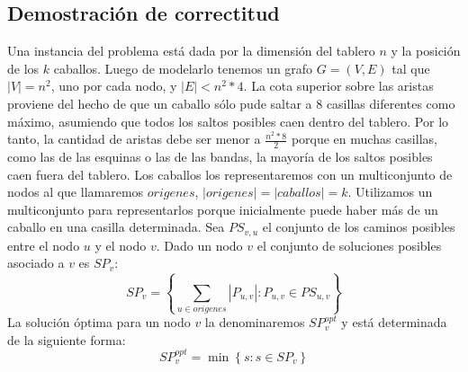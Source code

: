 \subsection{Demostración de correctitud}
Una instancia del problema está dada por la dimensión del tablero $n$ y la posición
de los $k$ caballos. Luego de modelarlo tenemos un grafo $G = (V, E)$ tal que $\left\vert{V}\right\vert = n^2$, uno
por cada nodo, y $\left\vert{E}\right\vert < n^2 * 4$. La cota superior sobre las aristas proviene del hecho de que
un caballo sólo pude saltar a 8 casillas diferentes como máximo, asumiendo que todos los
saltos posibles caen dentro del tablero. Por lo tanto, la cantidad de aristas debe ser menor
a $\frac{n^2 * 8}{2}$ porque en muchas casillas, como las de las esquinas o las de las bandas, la
mayoría de los saltos posibles caen fuera del tablero. Los caballos los representaremos con un multiconjunto
de nodos al que llamaremos $origenes$, $\left\vert{origenes}\right\vert = \left\vert{caballos}\right\vert = k$. Utilizamos un multiconjunto 
para representarlos porque inicialmente puede haber más de un caballo en una casilla determinada.
Sea $PS_{v,u}$ el conjunto de los caminos posibles entre el nodo $u$ y el nodo $v$.
Dado un nodo $v$ el conjunto de soluciones posibles asociado a $v$ es $SP_v$:
\begin{displaymath}
  SP_v = \left\{ { \sum_{u \in origenes} \left\vert{P_{u,v}}\right\vert : P_{u, v} \in PS_{u, v}} \right\}
\end{displaymath}
La solución óptima para un nodo $v$ la denominaremos $SP_v^{opt}$ y está determinada de la siguiente forma:
\begin{displaymath}
  SP_v^{opt} = \min \left\{ {s : s \in SP_v} \right\} 
\end{displaymath}

